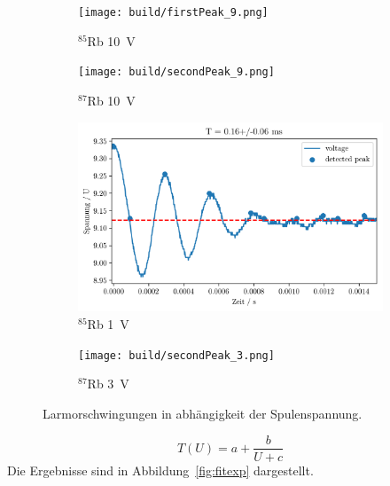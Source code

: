 \begin{figure}[h]
	\centering
	\begin{subfigure}[c]{0.45\textwidth}
	\begin{center}
		\texttt{[image: build/firstPeak\_9.png]}
	\end{center}
	\caption{$^{85}$Rb \SI{10}{\volt}}%
	\label{fig:}
	\end{subfigure}
	\begin{subfigure}[c]{0.45\textwidth}
	\begin{center}
		\texttt{[image: build/secondPeak\_9.png]}
	\end{center}
	\caption{$^{87}$Rb \SI{10}{\volt}}%
	\label{fig:}
	\end{subfigure}

	\begin{subfigure}[c]{0.45\textwidth}
	\begin{center}
		\includegraphics[width=\textwidth]{picture/firstPeak_3.png}
	\end{center}
	\caption{$^{85}$Rb \SI{1}{\volt}}%
	\label{fig:85a}
	\end{subfigure}
	\begin{subfigure}[c]{0.45\textwidth}
	\begin{center}
		\texttt{[image: build/secondPeak\_3.png]}
	\end{center}
	\caption{$^{87}$Rb \SI{3}{\volt}}%
	\label{fig:}
	\end{subfigure}
	\caption{Larmorschwingungen in abhängigkeit der Spulenspannung.}%
	\label{fig:periode}
\end{figure}
\begin{equation}
	\label{eq:fit}
	T(U) = a + \frac{b}{U + c}
\end{equation}
Die Ergebnisse sind in Abbildung~\ref{fig:fitexp} dargestellt.
